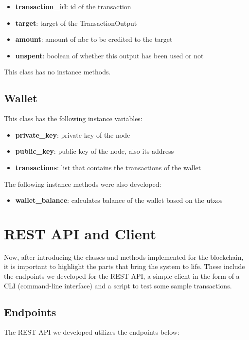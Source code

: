 \documentclass[conference]{IEEEtran}
\begin{document}
\begin{itemize}
\item \textbf{transaction\_id}: id of the transaction
\item \textbf{target}: target of the TransactionOutput
\item \textbf{amount}: amount of nbc to be credited to the target
\item \textbf{unspent}: boolean of whether this output has been used or not
\end{itemize}

This class has no instance methods.

\subsection{Wallet}
This class has the following instance variables:

\begin{itemize}
\item \textbf{private\_key}: private key of the node
\item \textbf{public\_key}: public key of the node, also its address
\item \textbf{transactions}: list that contains the transactions of the wallet
\end{itemize}

The following instance methods were also developed:

\begin{itemize}
\item \textbf{wallet\_balance}: calculates balance of the wallet based on the utxos
\end{itemize}

\section{\textbf{REST API and Client}}

Now, after introducing the classes and methods implemented for the blockchain, it is important to highlight the parts that bring the system to life. These include the endpoints we developed for the REST API, a simple client in the form of a CLI (command-line interface) and a script to test some sample transactions.

\subsection{Endpoints}
The REST API we developed utilizes the endpoints below:
\end{document}
